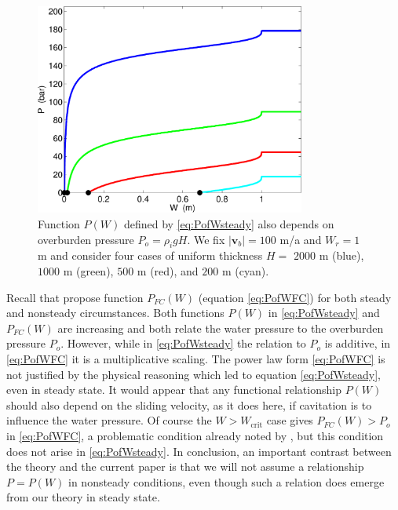 \documentclass[11pt,final]{amsart}
\newcommand\bv{\mathbf{v}}
\begin{document}
\begin{figure}[ht]
\includegraphics[width=3.5in,keepaspectratio=true]{psteady-Po}
\medskip
\caption{Function $P(W)$ defined by \eqref{eq:PofWsteady} also depends on overburden pressure $P_o=\rho_i g H$.  We fix $|\bv_b|=100$ m/a and $W_r=1$ m and consider four cases of uniform thickness $H=$ $2000$ m (blue), $1000$ m (green), $500$ m (red), and $200$ m (cyan).}
\label{fig:psteady-Po}
\end{figure}

Recall that \cite{FlowersClarke2002_theory} propose function $P_{FC}(W)$ (equation \eqref{eq:PofWFC}) for both steady and nonsteady circumstances.  Both functions $P(W)$ in \eqref{eq:PofWsteady} and $P_{FC}(W)$ are increasing and both relate the water pressure to the overburden pressure $P_o$.  However, while in \eqref{eq:PofWsteady} the relation to $P_o$ is additive, in \eqref{eq:PofWFC} it is a multiplicative scaling.  The power law form \eqref{eq:PofWFC} is not justified by the physical reasoning which led to equation \eqref{eq:PofWsteady}, even in steady state.   It would appear that any functional relationship $P(W)$ should also depend on the sliding velocity, as it does here, if cavitation is to influence the water pressure.  Of course the $W>W_{\text{crit}}$ case gives $P_{FC}(W) > P_o$ in \eqref{eq:PofWFC}, a problematic condition already noted by \cite{Schoofetal2012}, but this condition does not arise in \eqref{eq:PofWsteady}.  In conclusion, an important contrast between the \cite{FlowersClarke2002_theory} theory and the current paper is that we will not assume a relationship $P=P(W)$ in nonsteady conditions, even though such a relation does emerge from our theory in steady state.
\end{document}
